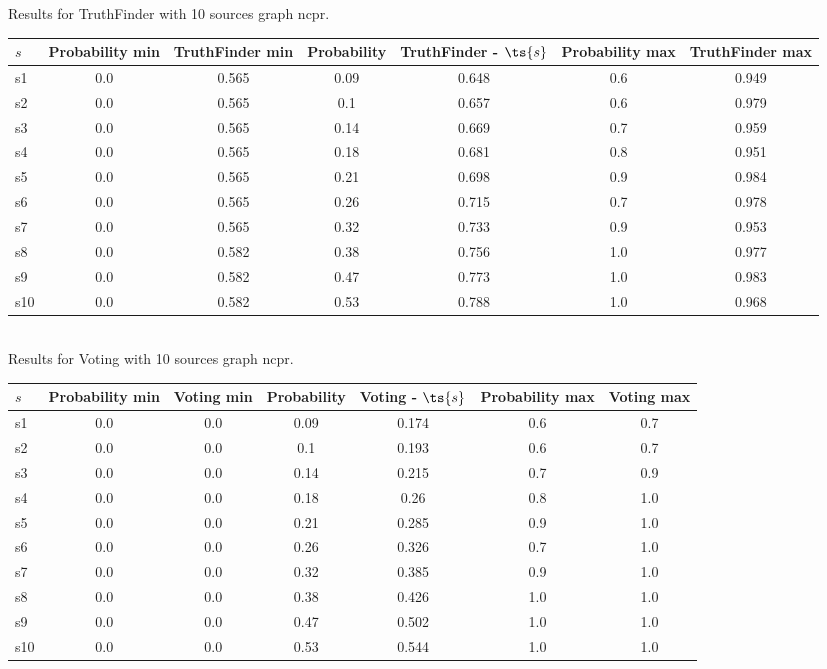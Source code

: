 \documentclass{article}
\begin{document}
\noindent Results for TruthFinder with 10 sources graph ncpr.

\noindent\begin{tabular}{|l|c|c|c|c|c|c|}
\hline
$s$& Probability min & TruthFinder min & Probability & TruthFinder - $\ts{s}$ & Probability max & TruthFinder max\\
\hline
s1 &0.0 & 0.565 & 0.09 & 0.648 & 0.6 & 0.949\\
\hline
s2 &0.0 & 0.565 & 0.1 & 0.657 & 0.6 & 0.979\\
\hline
s3 &0.0 & 0.565 & 0.14 & 0.669 & 0.7 & 0.959\\
\hline
s4 &0.0 & 0.565 & 0.18 & 0.681 & 0.8 & 0.951\\
\hline
s5 &0.0 & 0.565 & 0.21 & 0.698 & 0.9 & 0.984\\
\hline
s6 &0.0 & 0.565 & 0.26 & 0.715 & 0.7 & 0.978\\
\hline
s7 &0.0 & 0.565 & 0.32 & 0.733 & 0.9 & 0.953\\
\hline
s8 &0.0 & 0.582 & 0.38 & 0.756 & 1.0 & 0.977\\
\hline
s9 &0.0 & 0.582 & 0.47 & 0.773 & 1.0 & 0.983\\
\hline
s10 &0.0 & 0.582 & 0.53 & 0.788 & 1.0 & 0.968\\
\hline
\end{tabular}\\

\noindent Results for Voting with 10 sources graph ncpr.

\noindent\begin{tabular}{|l|c|c|c|c|c|c|}
\hline
$s$& Probability min & Voting min & Probability & Voting - $\ts{s}$ & Probability max & Voting max\\
\hline
s1 &0.0 & 0.0 & 0.09 & 0.174 & 0.6 & 0.7\\
\hline
s2 &0.0 & 0.0 & 0.1 & 0.193 & 0.6 & 0.7\\
\hline
s3 &0.0 & 0.0 & 0.14 & 0.215 & 0.7 & 0.9\\
\hline
s4 &0.0 & 0.0 & 0.18 & 0.26 & 0.8 & 1.0\\
\hline
s5 &0.0 & 0.0 & 0.21 & 0.285 & 0.9 & 1.0\\
\hline
s6 &0.0 & 0.0 & 0.26 & 0.326 & 0.7 & 1.0\\
\hline
s7 &0.0 & 0.0 & 0.32 & 0.385 & 0.9 & 1.0\\
\hline
s8 &0.0 & 0.0 & 0.38 & 0.426 & 1.0 & 1.0\\
\hline
s9 &0.0 & 0.0 & 0.47 & 0.502 & 1.0 & 1.0\\
\hline
s10 &0.0 & 0.0 & 0.53 & 0.544 & 1.0 & 1.0\\
\hline
\end{tabular}\\
\end{document}
